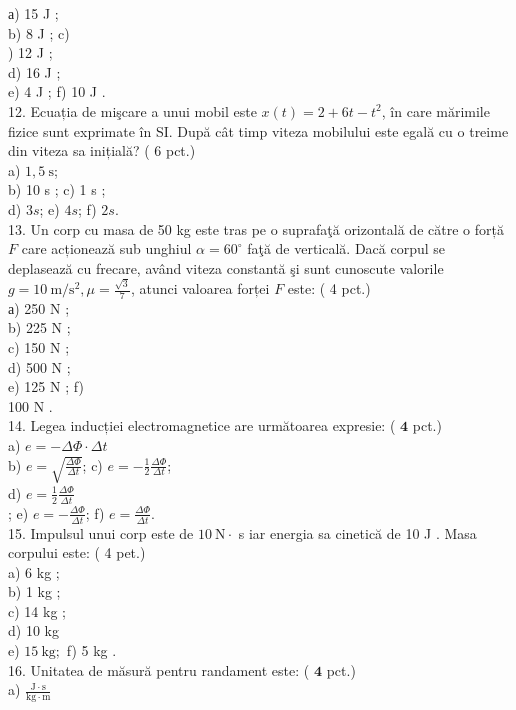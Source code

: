 а) 15 J ;\\
b) 8 J ; c)\\
) 12 J ;\\
d) 16 J ;\\
e) 4 J ; f) 10 J .\\
12. Ecuația de mişcare a unui mobil este $x(t)=2+6 t-t^{2}$, în care mărimile fizice sunt exprimate în SI. După cât timp viteza mobilului este egală cu o treime din viteza sa inițială? ( 6 pct.)\\
a) $1,5 \mathrm{~s}$;\\
b) 10 s ; c) 1 s ;\\
d) $3 s$; e) $4 s$; f) $2 s$.\\
13. Un corp cu masa de 50 kg este tras pe o suprafaţă orizontală de către o forță $F$ care acționează sub unghiul $\alpha=60^{\circ}$ faţă de verticală. Dacă corpul se deplasează cu frecare, având viteza constantă şi sunt cunoscute valorile $g=10 \mathrm{~m} / \mathrm{s}^{2}, \mu=\frac{\sqrt{3}}{7}$, atunci valoarea forței $F$ este: ( 4 pct.)\\
а) 250 N ;\\
b) 225 N ;\\
c) 150 N ;\\
d) 500 N ;\\
e) 125 N ; f)\\
100 N .\\
14. Legea inducției electromagnetice are următoarea expresie: ( $\mathbf{4}$ pct.)\\
a) $e=-\Delta \Phi \cdot \Delta t$\\
b) $e=\sqrt{\frac{\Delta \Phi}{\Delta t}}$; c) $e=-\frac{1}{2} \frac{\Delta \Phi}{\Delta t}$;\\
d) $e=\frac{1}{2} \frac{\Delta \Phi}{\Delta t}$\\
; e) $e=-\frac{\Delta \Phi}{\Delta t}$; f) $e=\frac{\Delta \Phi}{\Delta t}$.\\
15. Impulsul unui corp este de $10 \mathrm{~N} \cdot$ s iar energia sa cinetică de 10 J . Masa corpului este: ( 4 pet.)\\
a) 6 kg ;\\
b) 1 kg ;\\
c) 14 kg ;\\
d) 10 kg\\
e) $15 \mathrm{~kg} ;$ f) 5 kg .\\
16. Unitatea de măsură pentru randament este: ( $\mathbf{4}$ pct.)\\
a) $\frac{\mathrm{J} \cdot \mathrm{s}}{\mathrm{kg} \cdot \mathrm{m}}$\\
